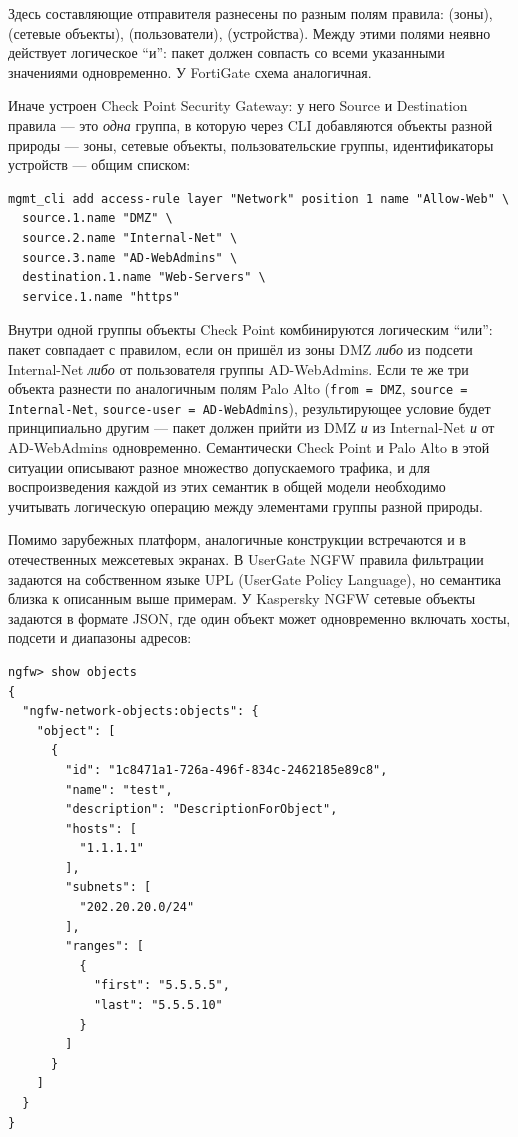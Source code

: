 Здесь составляющие отправителя разнесены по разным полям правила:  (зоны),  (сетевые объекты),  (пользователи),  (устройства). Между этими полями неявно действует логическое ``и'': пакет должен совпасть со всеми указанными значениями одновременно. У FortiGate схема аналогичная.

Иначе устроен Check Point Security Gateway: у него Source и Destination правила --- это \emph{одна} группа, в которую через CLI добавляются объекты разной природы --- зоны, сетевые объекты, пользовательские группы, идентификаторы устройств --- общим списком:

\begin{verbatim}
mgmt_cli add access-rule layer "Network" position 1 name "Allow-Web" \
  source.1.name "DMZ" \
  source.2.name "Internal-Net" \
  source.3.name "AD-WebAdmins" \
  destination.1.name "Web-Servers" \
  service.1.name "https"
\end{verbatim}

Внутри одной группы объекты Check Point комбинируются логическим ``или'': пакет совпадает с правилом, если он пришёл из зоны DMZ \emph{либо} из подсети Internal-Net \emph{либо} от пользователя группы AD-WebAdmins. Если те же три объекта разнести по аналогичным полям Palo Alto (\texttt{from = DMZ}, \texttt{source = Internal-Net}, \texttt{source-user = AD-WebAdmins}), результирующее условие будет принципиально другим --- пакет должен прийти из DMZ \emph{и} из Internal-Net \emph{и} от AD-WebAdmins одновременно. Семантически Check Point и Palo Alto в этой ситуации описывают разное множество допускаемого трафика, и для воспроизведения каждой из этих семантик в общей модели необходимо учитывать логическую операцию между элементами группы разной природы.

Помимо зарубежных платформ, аналогичные конструкции встречаются и в отечественных межсетевых экранах. В UserGate NGFW правила фильтрации задаются на собственном языке UPL (UserGate Policy Language), но семантика близка к описанным выше примерам. У Kaspersky NGFW сетевые объекты задаются в формате JSON, где один объект может одновременно включать хосты, подсети и диапазоны адресов:

\begin{verbatim}
ngfw> show objects
{
  "ngfw-network-objects:objects": {
    "object": [
      {
        "id": "1c8471a1-726a-496f-834c-2462185e89c8",
        "name": "test",
        "description": "DescriptionForObject",
        "hosts": [
          "1.1.1.1"
        ],
        "subnets": [
          "202.20.20.0/24"
        ],
        "ranges": [
          {
            "first": "5.5.5.5",
            "last": "5.5.5.10"
          }
        ]
      }
    ]
  }
}
\end{verbatim}


